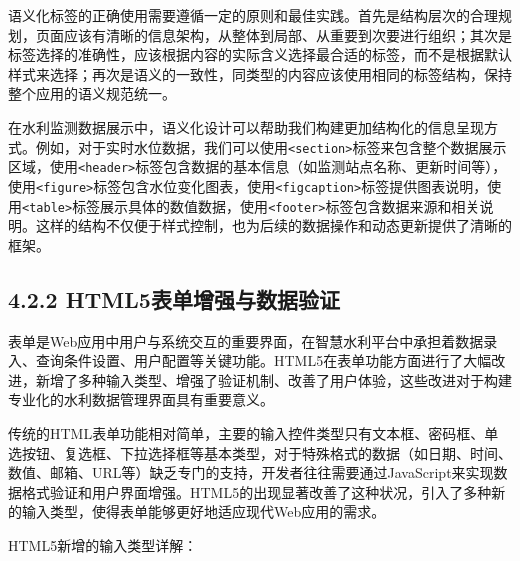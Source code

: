 语义化标签的正确使用需要遵循一定的原则和最佳实践。首先是结构层次的合理规划，页面应该有清晰的信息架构，从整体到局部、从重要到次要进行组织；其次是标签选择的准确性，应该根据内容的实际含义选择最合适的标签，而不是根据默认样式来选择；再次是语义的一致性，同类型的内容应该使用相同的标签结构，保持整个应用的语义规范统一。

在水利监测数据展示中，语义化设计可以帮助我们构建更加结构化的信息呈现方式。例如，对于实时水位数据，我们可以使用\texttt{\textless{}section\textgreater{}}标签来包含整个数据展示区域，使用\texttt{\textless{}header\textgreater{}}标签包含数据的基本信息（如监测站点名称、更新时间等），使用\texttt{\textless{}figure\textgreater{}}标签包含水位变化图表，使用\texttt{\textless{}figcaption\textgreater{}}标签提供图表说明，使用\texttt{\textless{}table\textgreater{}}标签展示具体的数值数据，使用\texttt{\textless{}footer\textgreater{}}标签包含数据来源和相关说明。这样的结构不仅便于样式控制，也为后续的数据操作和动态更新提供了清晰的框架。

\subsection{4.2.2 HTML5表单增强与数据验证}\label{html5ux8868ux5355ux589eux5f3aux4e0eux6570ux636eux9a8cux8bc1}

表单是Web应用中用户与系统交互的重要界面，在智慧水利平台中承担着数据录入、查询条件设置、用户配置等关键功能。HTML5在表单功能方面进行了大幅改进，新增了多种输入类型、增强了验证机制、改善了用户体验，这些改进对于构建专业化的水利数据管理界面具有重要意义。

传统的HTML表单功能相对简单，主要的输入控件类型只有文本框、密码框、单选按钮、复选框、下拉选择框等基本类型，对于特殊格式的数据（如日期、时间、数值、邮箱、URL等）缺乏专门的支持，开发者往往需要通过JavaScript来实现数据格式验证和用户界面增强。HTML5的出现显著改善了这种状况，引入了多种新的输入类型，使得表单能够更好地适应现代Web应用的需求。

HTML5新增的输入类型详解：

